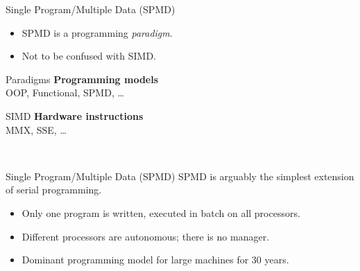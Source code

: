 \begin{frame}
  \begin{block}{Single Program/Multiple Data (SPMD)}\pause
    \begin{itemize}
      \item SPMD is a programming \emph{paradigm}.
      \item Not to be confused with SIMD.
	\end{itemize}\centering
	\begin{minipage}[t]{.45\textwidth}
	\vspace{0pt}
	\begin{block}{Paradigms}
	  \textbf{Programming models}\\
	  OOP, Functional, SPMD, \dots
	\end{block}
	\end{minipage}
	\hspace{.2cm}
	\begin{minipage}[t]{.45\textwidth}
	\vspace{0pt}
	\begin{block}{SIMD}
	  \textbf{Hardware instructions}\\
	  MMX, SSE, \dots
	\end{block}
	\end{minipage}
     \\[.4cm]
  \end{block}
\end{frame}


\begin{frame}
  \begin{block}{Single Program/Multiple Data (SPMD)}\pause
   SPMD is arguably the simplest extension of serial programming.
    \begin{itemize}
      \item Only one program is written, executed in batch on all processors.
      \item Different processors are autonomous; there is no manager.
      \item Dominant programming model for large machines for 30 years.
    \end{itemize}
  \end{block}
\end{frame}
